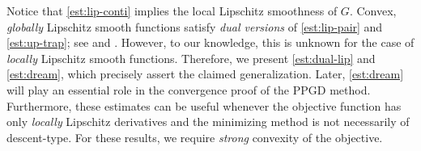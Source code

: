 \documentclass{amsart}
\theoremstyle{definition}
\begin{document}
Notice that \eqref{est:lip-conti} implies the local Lipschitz smoothness of $G$. Convex, \emph{globally} Lipschitz smooth functions satisfy \emph{dual versions} of \eqref{est:lip-pair} and \eqref{est:up-trap}; see \cite[p.~67, Thm.~2.1.5 (2.1.12)]{nesterov2018lectures} and \cite[p.~77, Thm.~2.1.12 (2.1.32)]{nesterov2018lectures}. However, to our knowledge, this is unknown for the case of \emph{locally} Lipschitz smooth functions. Therefore, we present \eqref{est:dual-lip} and \eqref{est:dream}, which precisely assert the claimed generalization. Later, \eqref{est:dream} will play an essential role in the convergence proof of the PPGD method. Furthermore, these estimates can be useful whenever the objective function has only \emph{locally} Lipschitz derivatives and the minimizing method is not necessarily of descent-type. For these results, we require \emph{strong} convexity of the objective. 
\end{document}
